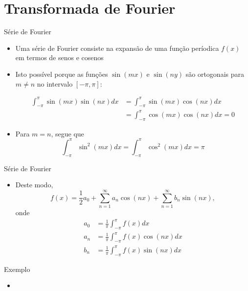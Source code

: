 \section{Transformada de Fourier}

\begin{frame}[fragile]{Série de Fourier}

    \begin{itemize}
        \item Uma série de Fourier consiste na expansão de uma função períodica $f(x)$ em termos
            de senos e cosenos

        \item Isto possível porque as funções $\sin(mx)$ e $\sin(ny)$ são ortogonais para 
            $m\neq n$ no intervalo $[-\pi, \pi]$:

        \begin{align*}
            \int_{-\pi}^\pi \sin(mx)\sin(nx) dx &= 
            \int_{-\pi}^\pi \sin(mx)\cos(nx) dx \\
            &= \int_{-\pi}^\pi \cos(mx)\cos(nx) dx = 0
        \end{align*}

        \item Para $m = n$, segue que
        \[
            \int_{-\pi}^\pi \sin^2(mx) dx = 
            \int_{-\pi}^\pi \cos^2(mx) dx = \pi
        \]

    \end{itemize}

\end{frame}

\begin{frame}[fragile]{Série de Fourier}

    \begin{itemize}
        \item Deste modo,
        \[
            f(x) = \frac{1}{2}a_0 + \sum_{n=1}^\infty a_n\cos(n x) + \sum_{n=1}^\infty b_n\sin(nx),
        \]
        onde
        \begin{align*}
            a_0 &= \frac{1}{\pi}\int_{-\pi}^{\pi} f(x)dx \\    
            a_n &= \frac{1}{\pi}\int_{-\pi}^{\pi} f(x)\cos(nx)dx \\    
            b_n &= \frac{1}{\pi}\int_{-\pi}^{\pi} f(x)\sin(nx)dx    
        \end{align*}
    
    \end{itemize}

\end{frame}

\begin{frame}[fragile]{Exemplo}

    \begin{itemize}
        \item
    \end{itemize}

\end{frame}
